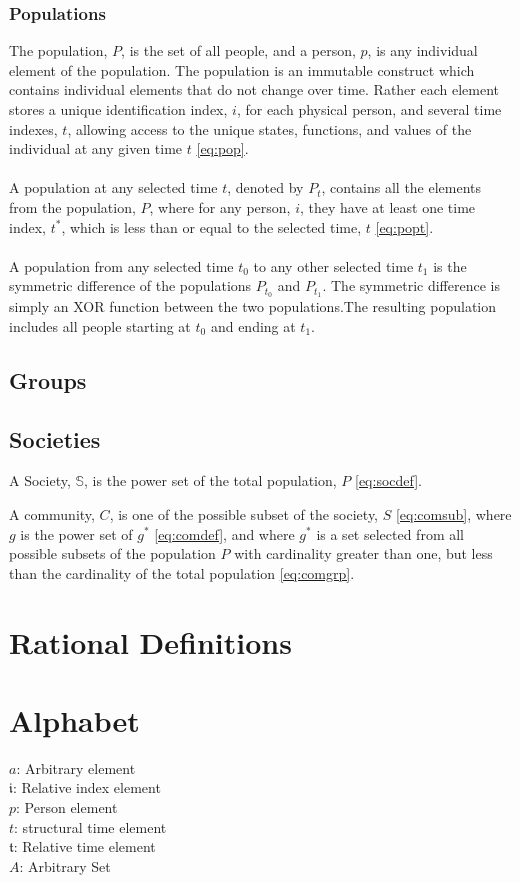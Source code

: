 \documentclass[]{article}
\begin{document}
\subsubsection*{Populations}
The population, $P$, is the set of all people, and a person, $p$, is any individual element of the population. The population is an immutable construct which contains individual elements that do not change over time. Rather each element stores a unique identification index, $i$, for each physical person, and several time indexes, $t$, allowing access to the unique states, functions, and values of the individual at any given time $t$ \eqref{eq:pop}.
\\
\\
A population at any selected time $t$, denoted by $P_{t}$, contains all the elements from the population, $P$, where for any person, $i$, they have at least one time index, $t^{*}$, which is less than or equal to the selected time, $t$ \eqref{eq:popt}.  
\\
\\
A population from any selected time $t_{0}$ to any other selected time $t_{1}$ is the symmetric difference of the populations $P_{t_{0}}$ and $P_{t_{1}}$. The symmetric difference is simply an XOR function between the two populations.The resulting population includes all people starting at $t_{0}$ and ending at $t_{1}$.
% 

%
\subsection*{Groups}

\subsection*{Societies}
%
A Society, $\mathbb{S}$, is the power set of the total population, $P$ \eqref{eq:socdef}.

%
A community, $C$, is one of the possible subset of the society, $S$ \eqref{eq:comsub}, where $g$ is the power set of $g^{*}$ \eqref{eq:comdef}, and where $g^{*}$ is a set selected from all possible subsets of the population $P$ with cardinality greater than one, but less than the cardinality of the total population \eqref{eq:comgrp}.
 
%
\section*{Rational Definitions}
\section*{Alphabet}
$a$: Arbitrary element \\
$\mathfrak{i}$: Relative index element \\
$p$: Person element \\
$t$: structural time element \\
$\mathfrak{t}$: Relative time element \\
$A$: Arbitrary Set \\
\end{document}
